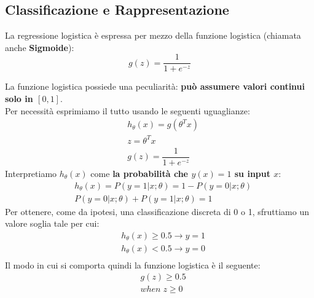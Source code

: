 \subsection{Classificazione e Rappresentazione}
La regressione logistica è espressa per mezzo della funzione logistica (chiamata anche \textbf{Sigmoide}):
$$ g(z) = \dfrac{1}{1 + e^{-z}} $$ 
\begin{center}
\end{center}
La funzione logistica possiede una peculiarità: \textbf{può assumere valori continui solo in $[0,1]$}. \\ Per necessità esprimiamo il tutto usando le seguenti uguaglianze:
\begin{align*}& h_\theta (x) = g ( \theta^T x ) \\& z = \theta^T x \\& g(z) = \dfrac{1}{1 + e^{-z}}\end{align*}
Interpretiamo $h_\theta (x)$ come \textbf{la probabilità che $y(x)=1$ su input $x$}:
\begin{align*}& h_\theta(x) = P(y=1 | x ; \theta) = 1 - P(y=0 | x ; \theta) \\& P(y = 0 | x;\theta) + P(y = 1 | x ; \theta) = 1\end{align*}
Per ottenere, come da ipotesi, una classificazione discreta di 0 o 1, sfruttiamo un valore soglia tale per cui:
\begin{align*}& h_\theta(x) \geq 0.5 \rightarrow y = 1 \\& h_\theta(x) < 0.5 \rightarrow y = 0 \\\end{align*}
Il modo in cui si comporta quindi la funzione logistica è il seguente:
\begin{align*}& g(z) \geq 0.5 \\& when \; z \geq 0\end{align*}
